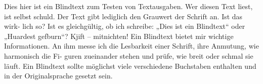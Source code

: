 \documentclass{book}
\begin{document}
\numberpstarttrue

\begin{pages}
\begin{Leftside}
\beginnumbering
\pstart
\blindtext

\pend

\pstart
\blindtext
\pend
\endnumbering   
\end{Leftside}

\begin{Rightside}
\beginnumbering
\pstart
Dies hier ist ein Blindtext zum Testen von Textausgaben. Wer diesen Text liest,
ist selbst schuld. Der Text gibt lediglich den Grauwert der Schrift an. Ist das wirk-
lich so? Ist es gleichgültig, ob ich schreibe: „Dies ist ein Blindtext“ oder „Huardest
gefburn“? Kjift – mitnichten! Ein Blindtext bietet mir wichtige Informationen. An
ihm messe ich die Lesbarkeit einer Schrift, ihre Anmutung, wie harmonisch die Fi-
guren zueinander stehen und prüfe, wie breit oder schmal sie läuft. Ein Blindtext
sollte möglichst viele verschiedene Buchstaben enthalten und in der Originalsprache
gesetzt sein.
\pend

\pstart
\blindtext
\pend

\endnumbering
\end{Rightside}
\end{pages}
\Pages
\end{document}
